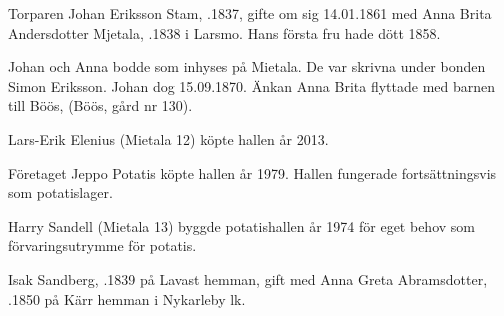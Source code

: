 Torparen Johan Eriksson Stam, .1837, gifte om sig 14.01.1861 med Anna Brita Andersdotter Mjetala,  .1838 i Larsmo. Hans första fru hade dött 1858.
\begin{jhchildren}
  \item {}
  \item {}
  \item {}
  \item {}
\end{jhchildren}

Johan och Anna bodde som inhyses på Mietala. De var skrivna under bonden Simon Eriksson. Johan dog 15.09.1870. Änkan Anna Brita flyttade med barnen till Böös, (Böös, gård nr 130).





Lars-Erik Elenius (Mietala 12) köpte hallen år 2013.\jhvspace{}


Företaget Jeppo Potatis köpte hallen år 1979. Hallen fungerade fortsättningsvis som potatislager.\jhvspace{}


Harry Sandell (Mietala 13) byggde potatishallen år 1974 för eget behov som förvaringsutrymme för potatis.\jhvspace{}





Isak Sandberg, .1839 på Lavast hemman, gift med Anna Greta Abramsdotter,  .1850 på Kärr hemman i Nykarleby lk.
\begin{jhchildren}
  \item {}
  \item {}
  \item {}
  \item {}
  \item {}
  \item {}
  \item {}
\end{jhchildren}

